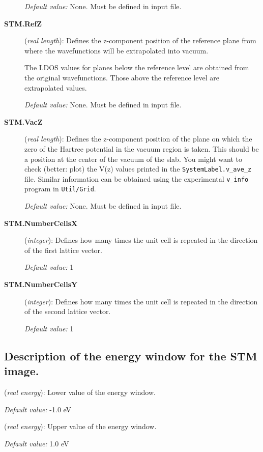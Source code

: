 \begin{description}
{\it Default value:} None. Must be defined in input file.

\item[{\bf STM.RefZ}] ({\it real length}):
 Defines the z-component position of the reference plane from
 where the wavefunctions will be extrapolated into vacuum.

 The LDOS values for planes below the reference level are obtained
 from the original wavefunctions. Those above the reference level are
 extrapolated values.

{\it Default value:} None. Must be defined in input file.

\item[{\bf STM.VacZ}] ({\it real length}):
 Defines the z-component position of the plane on which the
 zero of the Hartree potential in the vacuum region is taken.
 This should be a position at the center of the vacuum of the slab.
 You might want to check (better: plot) the V(z) values printed in the
 {\tt SystemLabel.v\_ave\_z} file. Similar information can be obtained
 using the experimental {\tt v\_info} program in {\tt Util/Grid}.
 
{\it Default value:} None. Must be defined in input file.

\item[{\bf STM.NumberCellsX}] ({\it integer}):
Defines how many times the unit cell is repeated
in the direction of the first lattice vector.

{\it Default value:} 1

\item[{\bf STM.NumberCellsY}] ({\it integer}):
Defines how many times the unit cell is repeated
in the direction of the second lattice vector.

{\it Default value:} 1

\end{description}

\vspace{5pt}
\subsection{Description of the energy window for the STM image.}

\begin{description}
\itemsep 10pt
\parsep 0pt

\item[{\bf STM.Emin}] ({\it real energy}): 
Lower value of the energy window.

{\it Default value:} -1.0 eV

\item[{\bf STM.Emax}] ({\it real energy}): 
Upper value of the energy window.

{\it Default value:} 1.0 eV

\end{description}



